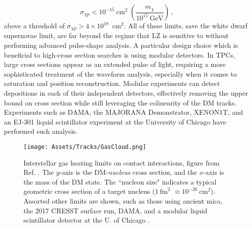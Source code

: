 \begin{equation}
    \sigma_{\chi p} < 10^{-15} \mathrm{~cm}^2 \;(\frac{m_\chi}{10^{15} \mathrm{~GeV}})~,
    \label{eq:mica}
\end{equation}
\noindent
above a threshold of $\sigma_{\chi p}>4\times 10^{18}$~cm$^2$.
All of these limits, save the white dwarf supernovae limit, are far beyond the regime that LZ is sensitive to without performing advanced pulse-shape analysis.
A particular design choice which is beneficial to high-cross section searches is using modular detectors.
In TPCs, large cross sections appear as an extended pulse of light, requiring a more sophisticated treatment of the waveform analysis, especially when it comes to saturation and position reconstruction.
Modular experiments can detect depositions in each of their independent detectors, effectively removing the upper bound on cross section while still leveraging the colinearity of the DM tracks.
Experiments such as DAMA\cite{bernabei_extended_1999}, the MAJORANA Demonstrator\cite{clark_direct_2020}, XENON1T\cite{xenon_collaboration_7_dark_2018}, and an EJ-301 liquid scintillator experiment at the University of Chicago \cite{cappiello_new_2021} have performed such analysis.

\begin{figure}
    \centering
    \texttt{[image: Assets/Tracks/GasCloud.png]}
    \caption[Interstellar gas heating limits on contact interactions, figure from Ref. \cite{bhoonah_detecting_2020}.]%
    {
    Interstellar gas heating limits on contact interactions, figure from Ref. \cite{bhoonah_detecting_2020}.
    The $y$-axis is the DM-\textit{nucleus} cross section, and the $x$-axis is the mass of the DM state.
    The ``nucleon size" indicates a typical geometric cross section of a target nucleus ($1\mathrm{~fm}^2$ $\approx 10^{-26}\mathrm{~cm}^2$).
    Assorted other limits are shown, such as those using ancient mica\cite{price_search_1986}, the 2017 CRESST surface run\cite{davis_probing_2017}, DAMA\cite{bernabei_dark_2021}, and a modular liquid scintillator detector at the U. of Chicago \cite{cappiello_new_2021}.
    }
    \label{fig:gas_clouds}
\end{figure}

